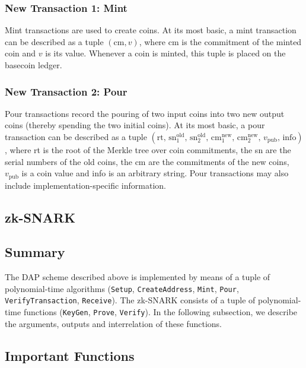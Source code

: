 \documentclass{article}
\begin{document}
\subsubsection{New Transaction 1: Mint}
Mint transactions are used to create coins. At its most basic, a mint transaction can be described as a tuple $(\text{cm}, v)$, where $\text{cm}$ is the commitment of the minted coin and $v$ is its value. Whenever a coin is minted, this tuple is placed on the basecoin ledger.

\subsubsection{New Transaction 2: Pour}
Pour transactions record the pouring of two input coins into two new output coins (thereby spending the two initial coins). At its most basic, a pour transaction can be described as a tuple $(\text{rt}, \, {\text{sn}}^{\text{old}}_1, \, {\text{sn}}^{\text{old}}_2, \, {\text{cm}}^{\text{new}}_1, \, {\text{cm}}^{\text{new}}_2, \, v_{\text{pub}}, \, \text{info})$, where rt is the root of the Merkle tree over coin commitments, the sn are the serial numbers of the old coins, the cm are the commitments of the new coins, $v_{\text{pub}}$ is a coin value and info is an arbitrary string. Pour transactions may also include implementation-specific information.

\subsection{zk-SNARK}

\subsection{Summary}

The DAP scheme described above is implemented by means of a tuple of polynomial-time algorithms (\texttt{Setup}, \texttt{CreateAddress}, \texttt{Mint}, \texttt{Pour}, \texttt{VerifyTransaction}, \texttt{Receive}). The zk-SNARK consists of a tuple of polynomial-time functions (\texttt{KeyGen}, \texttt{Prove}, \texttt{Verify}). In the following subsection, we describe the arguments, outputs and interrelation of these functions.

\subsection{Important Functions}
\end{document}
